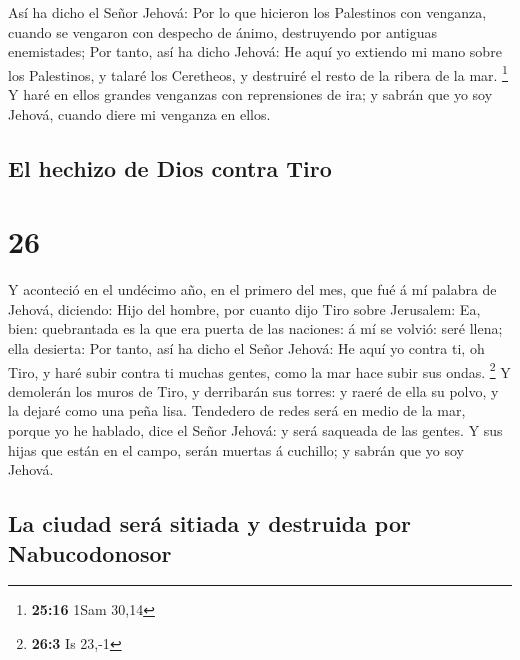  Así ha dicho el Señor Jehová: Por lo que hicieron los
Palestinos con venganza, cuando se vengaron con despecho de ánimo,
destruyendo por antiguas enemistades;  Por tanto, así ha
dicho Jehová: He aquí yo extiendo mi mano sobre los Palestinos, y talaré
los Ceretheos, y destruiré el resto de la ribera de la mar. \footnote{\textbf{25:16}
  1Sam 30,14}  Y haré en ellos grandes venganzas con
reprensiones de ira; y sabrán que yo soy Jehová, cuando diere mi
venganza en ellos.

\hypertarget{el-hechizo-de-dios-contra-tiro}{%
\subsection{El hechizo de Dios contra
Tiro}\label{el-hechizo-de-dios-contra-tiro}}

\hypertarget{section-25}{%
\section{26}\label{section-25}}

 Y aconteció en el undécimo año, en el primero del mes,
que fué á mí palabra de Jehová, diciendo:  Hijo del
hombre, por cuanto dijo Tiro sobre Jerusalem: Ea, bien: quebrantada es
la que era puerta de las naciones: á mí se volvió: seré llena; ella
desierta:  Por tanto, así ha dicho el Señor Jehová: He
aquí yo contra ti, oh Tiro, y haré subir contra ti muchas gentes, como
la mar hace subir sus ondas. \footnote{\textbf{26:3} Is 23,-1}
 Y demolerán los muros de Tiro, y derribarán sus torres: y
raeré de ella su polvo, y la dejaré como una peña lisa. 
Tendedero de redes será en medio de la mar, porque yo he hablado, dice
el Señor Jehová: y será saqueada de las gentes.  Y sus
hijas que están en el campo, serán muertas á cuchillo; y sabrán que yo
soy Jehová.

\hypertarget{la-ciudad-seruxe1-sitiada-y-destruida-por-nabucodonosor}{%
\subsection{La ciudad será sitiada y destruida por
Nabucodonosor}\label{la-ciudad-seruxe1-sitiada-y-destruida-por-nabucodonosor}}

